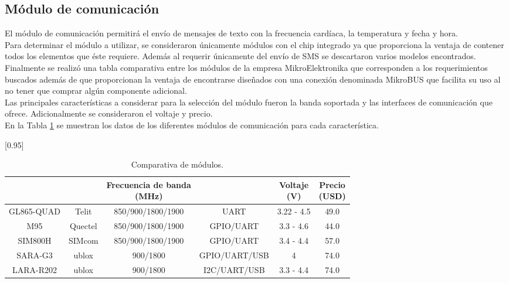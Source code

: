 
\subsection{Módulo de comunicación}
El módulo de comunicación permitirá el envío de mensajes de texto con la frecuencia cardíaca, la temperatura y fecha y hora. \\

Para determinar el módulo a utilizar, se consideraron únicamente módulos con el chip integrado ya que proporciona la ventaja de contener todos los elementos que éste requiere. Además al requerir únicamente del envío de SMS se descartaron varios modelos encontrados. \\

Finalmente se realizó una tabla comparativa entre los módulos de la empresa MikroElektronika que corresponden a los requerimientos buscados además de que proporcionan la ventaja de encontrarse diseñados con una conexión denominada MikroBUS que facilita su uso al no tener que comprar algún componente adicional. \\

Las principales características a considerar para la selección del módulo fueron la banda soportada y las interfaces de comunicación que ofrece. Adicionalmente se consideraron el voltaje y precio. \\

En la Tabla \ref{analisis:moduloGSM} se muestran los datos de los diferentes módulos de comunicación para cada característica.\\

\begin{table}[htbp]
	\begin{center}
		\scalebox{0.93}[0.95]{
		\begin{tabular}{|c|c|c|c|c|c|}
			\hline
			\thead{Modelo}&\thead{Fabricante}&\thead{Frecuencia de banda\\(MHz)}&\thead{Interfaces}&\thead{Voltaje \\ (V)}&\thead{Precio\\(USD)}\\
			\hline
			\hline
			GL865-QUAD & Telit&850/900/1800/1900&UART&3.22 - 4.5&49.0\\
			\hline
			M95 & Quectel&850/900/1800/1900&GPIO/UART&3.3 - 4.6& 44.0\\
			\hline
			SIM800H & SIMcom&850/900/1800/1900&GPIO/UART&3.4 - 4.4&57.0\\
			\hline
			SARA-G3 & ublox&900/1800&GPIO/UART/USB&4&74.0\\
			\hline
			LARA-R202& ublox&900/1800&I2C/UART/USB&3.3 - 4.4&74.0\\
			\hline
		\end{tabular}}
		\caption{Comparativa de módulos.}
		\label{analisis:moduloGSM}
	\end{center}
\end{table}
	

